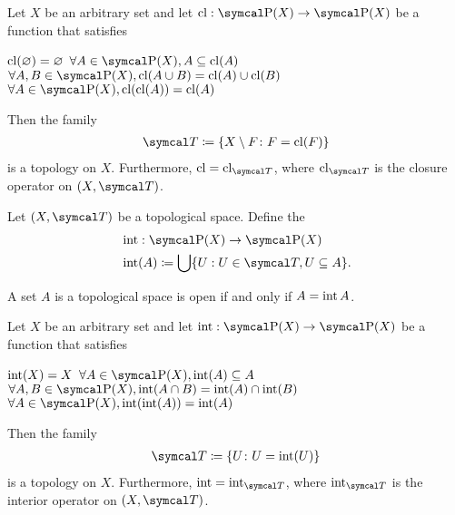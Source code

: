 \begin{proposition}\label{thm:closure_operator_axioms}\cite[14]{Engelking1989}
  Let $X$ be an arbitrary set and let $\Cl: \Power(X) \to \Power(X)$ be a function that satisfies
  \begin{description}
     $\operatorname{cl}(\varnothing) = \varnothing$
     $\forall A \in \Power(X), A \subseteq \Cl(A)$
     $\forall A, B \in \Power(X), \Cl(A \cup B) = \Cl(A) \cup \Cl(B)$
     $\forall A \in \Power(X), \Cl(\Cl(A)) = \Cl(A)$
  \end{description}

  Then the family
  \begin{align*}
    \Cal{T} \coloneqq \{ X \setminus F \colon F = \Cl(F) \}
  \end{align*}
  is a topology on $X$. Furthermore, $\Cl = \Cl_{\Cal{T}}$, where $\Cl_{\Cal{T}}$ is the closure operator on $(X, \Cal{T})$.
\end{proposition}

\begin{definition}\label{def:interior_operator}\cite[15]{Engelking1989}
  Let $(X, \Cal{T})$ be a topological space. Define the 
  \begin{align*}
    &\Int: \Power(X) \to \Power(X) \\
    &\Int(A) \coloneqq \bigcup \{ U : U \in \Cal{T}, U \subseteq A \}.
  \end{align*}
\end{definition}

\begin{proposition}\label{thm:set_open_iff_matches_interior}
  A set $A$ is a topological space is open if and only if $A = \operatorname{int} A$.
\end{proposition}

\begin{proposition}\label{thm:interior_operator_axioms}
  Let $X$ be an arbitrary set and let $\Int: \Power(X) \to \Power(X)$ be a function that satisfies
  \begin{description}
     $\operatorname{int}(X) = X$
     $\forall A \in \Power(X), \Int(A) \subseteq A$
     $\forall A, B \in \Power(X), \Int(A \cap B) = \Int(A) \cap \Int(B)$
     $\forall A \in \Power(X), \Int(\Int(A)) = \Int(A)$
  \end{description}

  Then the family
  \begin{align*}
    \Cal{T} \coloneqq \{ U \colon U = \Int(U) \}
  \end{align*}
  is a topology on $X$. Furthermore, $\Int = \Int_{\Cal{T}}$, where $\Int_{\Cal{T}}$ is the interior operator on $(X, \Cal{T})$.
\end{proposition}

